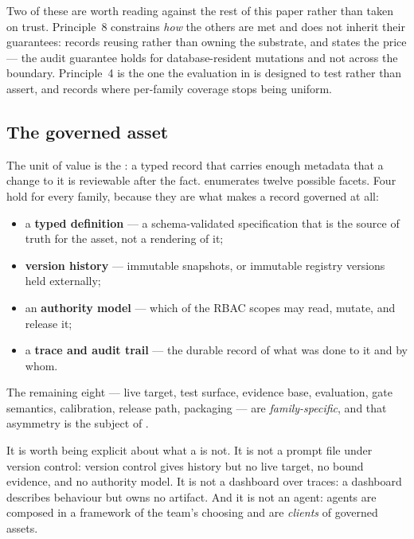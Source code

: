 Two of these are worth reading against the rest of this paper rather than taken
on trust. Principle~8 constrains \emph{how} the others are met and does not
inherit their guarantees:  records reusing \mlflow{} rather
than owning the substrate, and  states the price --- the
audit guarantee holds for database-resident mutations and not across the
\mlflow{} boundary. Principle~4 is the one the evaluation in
 is designed to test rather than assert, and
 records where per-family coverage stops being uniform.

\subsection{The governed asset}



The unit of value is the \gasset{}: a typed record that carries enough metadata
that a change to it is reviewable after the fact.  enumerates
twelve possible facets. Four hold for every family, because they are what makes a
record governed at all:

\begin{itemize}
\item a \textbf{typed definition} --- a schema-validated specification that is the
      source of truth for the asset, not a rendering of it;
\item \textbf{version history} --- immutable snapshots, or immutable registry
      versions held externally;
\item an \textbf{authority model} --- which of the \statScopesW{} RBAC scopes may
      read, mutate, and release it;
\item a \textbf{trace and audit trail} --- the durable record of what was done to
      it and by whom.
\end{itemize}

The remaining eight --- live target, test surface, evidence base, evaluation, gate
semantics, calibration, release path, packaging --- are \emph{family-specific}, and
that asymmetry is the subject of .

It is worth being explicit about what a \gasset is not. It is not a prompt file
under version control: version control gives history but no live target, no bound
evidence, and no authority model. It is not a dashboard over traces: a dashboard
describes behaviour but owns no artifact. And it is not an agent: agents are
composed in a framework of the team's choosing and are \emph{clients} of governed
assets.

